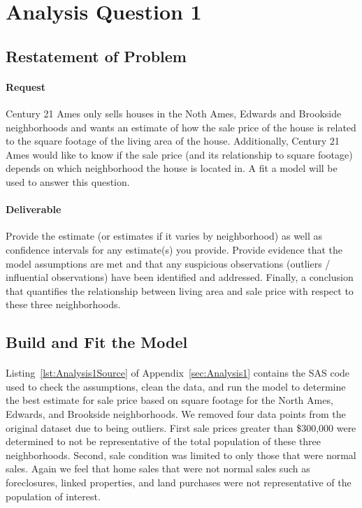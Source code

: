 \documentclass[11pt]{scrartcl} %
\begin{document}

\section{Analysis Question 1}
\subsection{Restatement of Problem}
\paragraph{Request} Century 21 Ames only sells houses in the Noth Ames, Edwards and Brookside neighborhoods and wants an estimate of how the sale price of the house is related to the square footage of the living area of the house. Additionally, Century 21 Ames would like to know if the sale price (and its relationship to square footage) depends on which neighborhood the house is located in. A fit a model will be used to answer this question.
\paragraph{Deliverable} Provide the estimate (or estimates if it varies by neighborhood) as well as confidence intervals for any estimate(s) you provide. Provide evidence that the model assumptions are met and that any suspicious observations (outliers / influential observations) have been identified and addressed. Finally, a conclusion that quantifies the relationship between living area and sale price with respect to these three neighborhoods.
\subsection{Build and Fit the Model}
\paragraph{} Listing~\ref{lst:Analysis1Source} of Appendix~\ref{sec:Analysis1} contains the SAS code used to check the assumptions, clean the data, and run the model to determine the best estimate for sale price based on square footage for the North Ames, Edwards, and Brookside neighborhoods. We removed four data points from the original dataset due to being outliers. First sale prices greater than \$300,000 were determined to not be representative of the total population of these three neighborhoods. Second, sale condition was limited to only those that were normal sales. Again we feel that home sales that were not normal sales such as foreclosures, linked properties, and land purchases were not representative of the population of interest.
\end{document}
